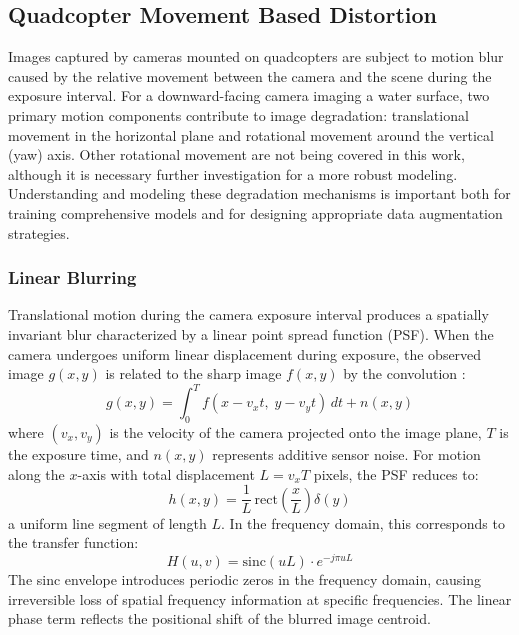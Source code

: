 \subsection{Quadcopter Movement Based Distortion}

Images captured by cameras mounted on quadcopters are subject to motion blur caused by the relative movement between the camera and the scene during the exposure interval. For a downward-facing camera imaging a water surface, two primary motion components contribute to image degradation: translational movement in the horizontal plane and rotational movement around the vertical (yaw) axis. Other rotational movement are not being covered in this work, although it is necessary further investigation for a more robust modeling. Understanding and modeling these degradation mechanisms is important both for training comprehensive models and for designing appropriate data augmentation strategies.

    \subsubsection{Linear Blurring}

    Translational motion during the camera exposure interval produces a spatially invariant blur characterized by a linear point spread function (PSF). When the camera undergoes uniform linear displacement during exposure, the observed image $g(x, y)$ is related to the sharp image $f(x, y)$ by the convolution \cite{GonzalezWoods2018}:
    \begin{equation}
        g(x, y) = \int_0^T f(x - v_x t, \; y - v_y t) \, dt + n(x, y)
        \label{eq:motion_blur_convolution}
    \end{equation}
    where $(v_x, v_y)$ is the velocity of the camera projected onto the image plane, $T$ is the exposure time, and $n(x, y)$ represents additive sensor noise. For motion along the $x$-axis with total displacement $L = v_x T$ pixels, the PSF reduces to:
    \begin{equation}
        h(x, y) = \frac{1}{L} \, \mathrm{rect}\!\left(\frac{x}{L}\right) \delta(y)
        \label{eq:linear_psf}
    \end{equation}
    a uniform line segment of length $L$. In the frequency domain, this corresponds to the transfer function:
    \begin{equation}
        H(u, v) = \mathrm{sinc}(uL) \cdot e^{-j\pi u L}
        \label{eq:linear_otf}
    \end{equation}
    The sinc envelope introduces periodic zeros in the frequency domain, causing irreversible loss of spatial frequency information at specific frequencies. The linear phase term reflects the positional shift of the blurred image centroid.

